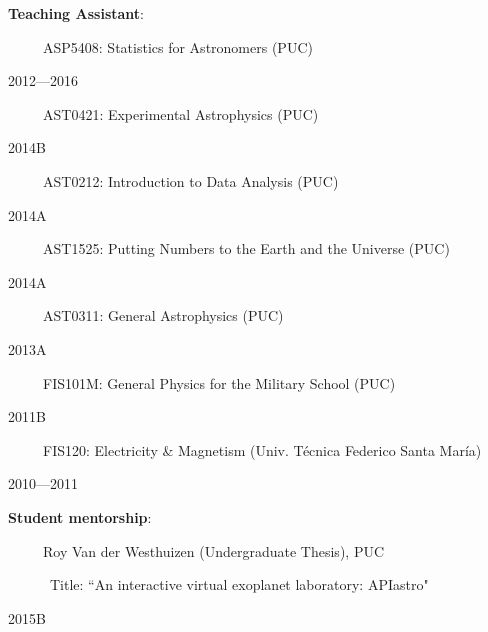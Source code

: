 \documentclass[11pt, a4paper]{article} %
\begin{document}
\begin{flushleft}%
  \setlength{\leftskip}{0.2cm}%
\textbf{Teaching Assistant}:
\end{flushleft}
\begin{minipage}[t]{0.6\textwidth}
\ \ \ \ \ ASP5408: Statistics for Astronomers (PUC)
\end{minipage}
\begin{minipage}[t]{0.4\textwidth}
\hfill 2012---2016
\end{minipage}
\begin{minipage}[t]{0.7\textwidth}
\ \ \ \ \ AST0421: Experimental Astrophysics (PUC)
\end{minipage}
\begin{minipage}[t]{0.3\textwidth}
\hfill 2014B
\end{minipage}
\begin{minipage}[t]{0.7\textwidth}
\ \ \ \ \ AST0212: Introduction to Data Analysis (PUC)
\end{minipage}
\begin{minipage}[t]{0.3\textwidth}
\hfill 2014A
\end{minipage}
\begin{minipage}[t]{0.7\textwidth}
\ \ \ \ \ AST1525: Putting Numbers to the Earth and the Universe (PUC)
\end{minipage}
\begin{minipage}[t]{0.3\textwidth}
\hfill 2014A
\end{minipage}
\begin{minipage}[t]{0.7\textwidth}
\ \ \ \ \ AST0311: General Astrophysics (PUC)
\end{minipage}
\begin{minipage}[t]{0.3\textwidth}
\hfill 2013A
\end{minipage}
\begin{minipage}[t]{0.7\textwidth}
\ \ \ \ \ FIS101M: General Physics for the Military School (PUC)
\end{minipage}
\begin{minipage}[t]{0.3\textwidth}
\hfill 2011B
\end{minipage}
\begin{minipage}[t]{0.7\textwidth}
\ \ \ \ \ FIS120: Electricity \& Magnetism (Univ. T\'ecnica Federico Santa Mar\'ia)
\end{minipage}
\begin{minipage}[t]{0.3\textwidth}
\hfill 2010---2011
\end{minipage}

\begin{flushleft}%
  \setlength{\leftskip}{0.2cm}%
\textbf{Student mentorship}:
\end{flushleft}
\begin{minipage}[t]{0.6\textwidth}
\ \ \ \ \ Roy Van der Westhuizen (Undergraduate Thesis), PUC

\ \ \ \ \ \ Title: ``An interactive virtual exoplanet laboratory: APIastro"
\end{minipage}
\begin{minipage}[t]{0.4\textwidth}
\hfill 2015B
\end{minipage}
\end{document}
